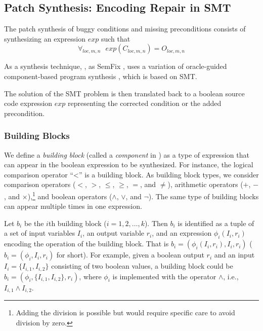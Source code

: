 \subsection{Patch Synthesis: Encoding Repair in SMT}
\label{subsect:encoding}

The patch synthesis of buggy \ourif conditions and missing preconditions consists of synthesizing an expression $exp$ such that
\begin{equation}
\forall_{loc,m,n} \mbox{~~}exp(C_{loc,m,n}) =  O_{loc,m,n} 
\label{eq:repair-if}
\end{equation}

As a synthesis technique, \nopol, as SemFix \cite{nguyen2013semfix}, uses a variation of oracle-guided component-based program synthesis \cite{jha2010oracle}, which is based on SMT.

The solution of the SMT problem is then translated back to a boolean source code expression $exp$ representing the corrected \ourif condition or the added precondition.

\subsubsection{Building Blocks}
\label{sect:bb}

We define a {\em building block} (called a {\em component} in \cite{jha2010oracle}) as a type of expression that can appear in the boolean expression to be synthesized. 
For instance, the logical comparison operator ``<'' is a building block. As building block types, we consider comparison operators ($<$, $>$, $\leq$, $\geq$, $=$, and $\neq$), arithmetic operators ($+$, $-$, and $\times$),\footnote{Adding the division is possible but would require specific care to avoid division by zero.} and boolean operators ($\wedge$, $\vee$, and $\lnot$). The same type of building blocks can appear multiple times in one expression. 

Let $b_i$ be the $i$th building block ($i=1,2,\ldots,k$). Then $b_i$ is identified as a tuple of a set of input variables $I_i$, an output variable $r_i$, and an expression $\phi_{i}(I_i,r_i)$ encoding the operation of the building block.
That is $b_i=(\phi_{i}(I_i,r_i),I_i,r_i)$ ($b_i=(\phi_{i},I_i,r_i)$ for short). For example, given a boolean output $r_i$ and an input $I_i=\{I_{i,1}, I_{i,2}\}$ consisting of two boolean values, a building block could be $b_i=(\phi_{i},\{I_{i,1}, I_{i,2}\},r_i)$, where $\phi_{i}$ is implemented with the operator $\wedge$, i.e.,  $I_{i,1} \wedge I_{i,2}$. 

